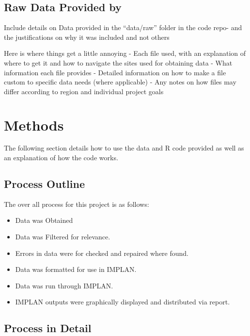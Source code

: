 \documentclass[
]{book}
\providecommand{\tightlist}{%
  \setlength{\itemsep}{0pt}\setlength{\parskip}{0pt}}
\begin{document}
\hypertarget{raw-data-provided-by}{%
\section{Raw Data Provided by}\label{raw-data-provided-by}}

Include details on Data provided in the ``data/raw'' folder in the code repo- and the justifications on why it was included and not others

Here is where things get a little annoying
- Each file used, with an explanation of where
to get it and how to navigate the sites used for obtaining data
- What information each file provides
- Detailed information on how to make a file custom to specific data needs (where applicable)
- Any notes on how files may differ according to region and individual project goals

\hypertarget{methods}{%
\chapter{Methods}\label{methods}}

The following section details how to use the data and R code provided as well as an explanation of how the code works.

\hypertarget{process-outline}{%
\section{Process Outline}\label{process-outline}}

The over all process for this project is as follows:

\begin{itemize}
\tightlist
\item
  Data was Obtained
\item
  Data was Filtered for relevance.
\item
  Errors in data were for checked and repaired where found.
\item
  Data was formatted for use in IMPLAN.
\item
  Data was run through IMPLAN.
\item
  IMPLAN outputs were graphically displayed and distributed via report.
\end{itemize}

\hypertarget{process-in-detail}{%
\section{Process in Detail}\label{process-in-detail}}
\end{document}
